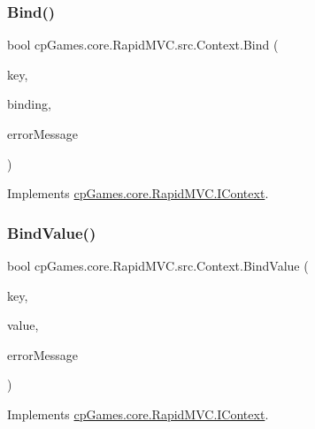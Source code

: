 \subsubsection{\texorpdfstring{Bind()}{Bind()}}
{\footnotesize\ttfamily bool cp\+Games.\+core.\+Rapid\+M\+V\+C.\+src.\+Context.\+Bind (\begin{DoxyParamCaption}\item[{\mbox{\hyperlink{interfacecp_games_1_1core_1_1_rapid_m_v_c_1_1_i_binding_key}{I\+Binding\+Key}}}]{key,  }\item[{out \mbox{\hyperlink{interfacecp_games_1_1core_1_1_rapid_m_v_c_1_1_i_binding}{I\+Binding}}}]{binding,  }\item[{out string}]{error\+Message }\end{DoxyParamCaption})}



Implements \mbox{\hyperlink{interfacecp_games_1_1core_1_1_rapid_m_v_c_1_1_i_context_a5f24672bfe61416bdc05a8e68eb147d0}{cp\+Games.\+core.\+Rapid\+M\+V\+C.\+I\+Context}}.

\mbox{\label{classcp_games_1_1core_1_1_rapid_m_v_c_1_1src_1_1_context_afc41dc6765626b99f60958bcbb31cf37}} 
\subsubsection{\texorpdfstring{BindValue()}{BindValue()}}
{\footnotesize\ttfamily bool cp\+Games.\+core.\+Rapid\+M\+V\+C.\+src.\+Context.\+Bind\+Value (\begin{DoxyParamCaption}\item[{\mbox{\hyperlink{interfacecp_games_1_1core_1_1_rapid_m_v_c_1_1_i_binding_key}{I\+Binding\+Key}}}]{key,  }\item[{object}]{value,  }\item[{out string}]{error\+Message }\end{DoxyParamCaption})}



Implements \mbox{\hyperlink{interfacecp_games_1_1core_1_1_rapid_m_v_c_1_1_i_context_abd1373878fbfe20526c96a476e939e9e}{cp\+Games.\+core.\+Rapid\+M\+V\+C.\+I\+Context}}.

\mbox{\label{classcp_games_1_1core_1_1_rapid_m_v_c_1_1src_1_1_context_af533afc2087ed95d2c5123a3c69f66c5}} 
